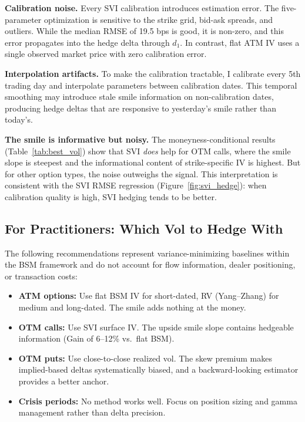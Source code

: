 \documentclass[12pt, letterpaper]{article}
\begin{document}
\textbf{Calibration noise.} Every SVI calibration introduces estimation error. The five-parameter optimization is sensitive to the strike grid, bid-ask spreads, and outliers. While the median RMSE of 19.5 bps is good, it is non-zero, and this error propagates into the hedge delta through $d_1$. In contrast, flat ATM IV uses a single observed market price with zero calibration error.

\textbf{Interpolation artifacts.} To make the calibration tractable, I calibrate every 5th trading day and interpolate parameters between calibration dates. This temporal smoothing may introduce stale smile information on non-calibration dates, producing hedge deltas that are responsive to yesterday's smile rather than today's.

\textbf{The smile is informative but noisy.} The moneyness-conditional results (Table~\ref{tab:best_vol}) show that SVI \textit{does} help for OTM calls, where the smile slope is steepest and the informational content of strike-specific IV is highest. But for other option types, the noise outweighs the signal. This interpretation is consistent with the SVI RMSE regression (Figure~\ref{fig:svi_hedge}): when calibration quality is high, SVI hedging tends to be better.

\subsection{For Practitioners: Which Vol to Hedge With}

The following recommendations represent variance-minimizing baselines within the BSM framework and do not account for flow information, dealer positioning, or transaction costs:

\begin{itemize}
    \item \textbf{ATM options:} Use flat BSM IV for short-dated, RV (Yang--Zhang) for medium and long-dated. The smile adds nothing at the money.
    \item \textbf{OTM calls:} Use SVI surface IV. The upside smile slope contains hedgeable information (Gain of 6--12\% vs.\ flat BSM).
    \item \textbf{OTM puts:} Use close-to-close realized vol. The skew premium makes implied-based deltas systematically biased, and a backward-looking estimator provides a better anchor.
    \item \textbf{Crisis periods:} No method works well. Focus on position sizing and gamma management rather than delta precision.
\end{itemize}
\end{document}
